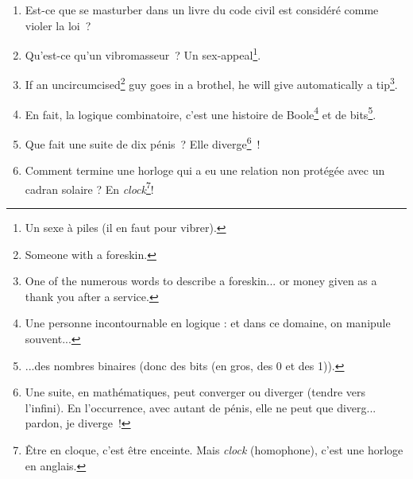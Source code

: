 \documentclass[10pt,a5paper,fullpage]{book}
\begin{document}
\begin{enumerate}
		\item Est-ce que se masturber dans un livre du code civil est considéré comme violer la loi~?
		\item Qu’est-ce qu’un vibromasseur~? Un sex-appeal\footnote{Un sexe à piles (il en faut pour vibrer).}. 
		\item If an uncircumcised\footnote{Someone with a foreskin.} guy goes in a brothel, he will give automatically a tip\footnote{One of the numerous words to describe a foreskin... or money given as a thank you after a service.}. 
		\item En fait, la logique combinatoire, c’est une histoire de Boole\footnote{Une personne incontournable en logique : et dans ce domaine, on manipule souvent...} et de bits\footnote{...des nombres binaires (donc des bits (en gros, des 0 et des 1)).}.
		\item Que fait une suite de dix pénis~? Elle diverge\footnote{Une suite, en mathématiques, peut converger ou diverger (tendre vers l'infini). En l'occurrence, avec autant de pénis, elle ne peut que diverg... pardon, je diverge~!}~!
		\item Comment termine une horloge qui a eu une relation non protégée avec un cadran solaire ? En \textit{clock}\footnote{Être en cloque, c'est être enceinte. Mais \textit{clock} (homophone), c'est une horloge en anglais.}!
	\end{enumerate}
\end{document}
